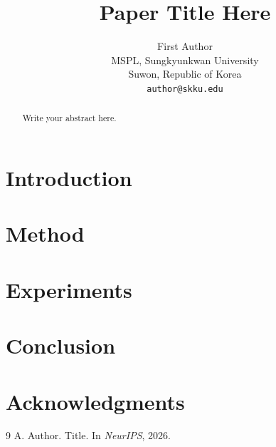 \documentclass{article}
\title{Paper Title Here}
\author{%
  First Author \\
  MSPL, Sungkyunkwan University \\
  Suwon, Republic of Korea \\
  \texttt{author@skku.edu}
}
\begin{document}
\maketitle

\begin{abstract}
Write your abstract here.
\end{abstract}

\section{Introduction}

\section{Method}

\section{Experiments}

\section{Conclusion}

\section*{Acknowledgments}

\begin{thebibliography}{9}
 A. Author. Title. In \emph{NeurIPS}, 2026.
\end{thebibliography}
\end{document}
